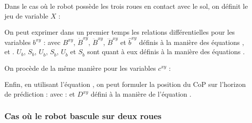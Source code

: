 				Dans le cas où le robot possède les trois roues en contact avec le sol, on définit le jeu de variable $X$ :
				
				On peut exprimer dans un premier temps les relations différentielles pour les variables $b^{xy}$ :
				avec $B^{xy}$, $\dot{B}^{xy}$, $\ddot{B}^{xy}$, $\dddot{B}^{xy}$ et $\hat{b}^{xy}$ définis 
				à la manière des équations ,  et .
				$U_b$, $S_b$, $U_{\dot{b}}$, $S_{\dot{b}}$, $U_{\ddot{b}}$ et $S_{\ddot{b}}$ sont quant à eux définis à la manière des équations 
				  .
				
				On procède de la même manière pour les variables $c^{xy}$ :
				
				Enfin, en utilisant l'équation , on peut formuler la position du CoP sur l'horizon de prédiction :
				avec :
				et $D^{xy}$ défini à la manière de l'équation .
				
			\subsubsection{Cas où le robot bascule sur deux roues}
			
